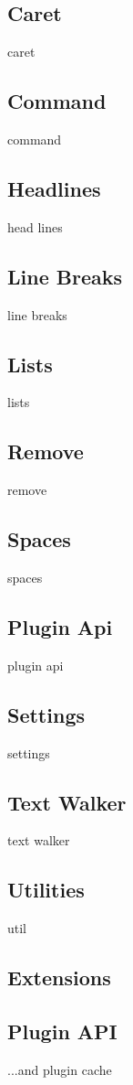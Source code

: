 \subsection{Caret}
caret
\subsection{Command}
command
\subsection{Headlines}
head lines
\subsection{Line Breaks}
line breaks
\subsection{Lists}
lists
\subsection{Remove}
remove
\subsection{Spaces}
spaces

\subsection{Plugin Api}
plugin api
\subsection{Settings}
settings
\subsection{Text Walker}
text walker
\subsection{Utilities}
util

\subsection{Extensions}

\subsection{Plugin API} ...and plugin cache

